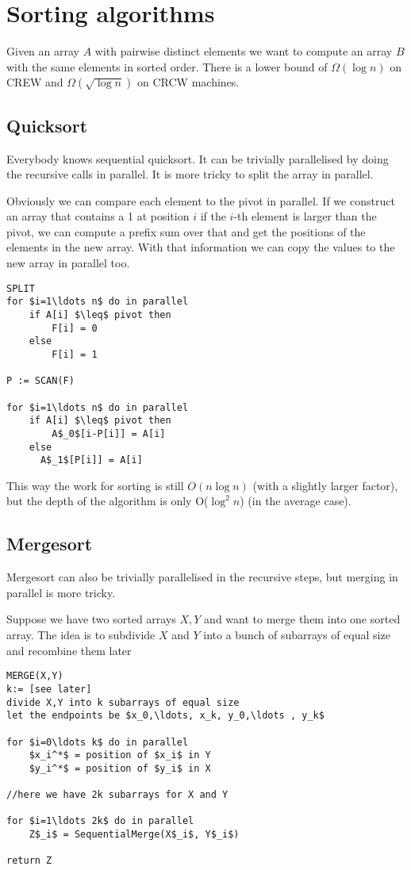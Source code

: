 \section{Sorting algorithms}

Given an array $A$ with pairwise distinct elements we want to compute an array $B$ with the same elements in sorted order. There is a lower bound of $\Omega(\log n)$ on CREW and $\Omega(\sqrt{\log n})$ on CRCW machines.

\subsection{Quicksort}

Everybody knows sequential quicksort. It can be trivially parallelised by doing the recursive calls in parallel. It is more tricky to split the array in parallel.

Obviously we can compare each element to the pivot in parallel. If we construct an array that contains a 1 at position $i$ if the $i$-th element is larger than the pivot, we can compute a prefix sum over that and get the positions of the elements in the new array. With that information we can copy the values to the new array in parallel too.

\begin{lstlisting}
SPLIT
for $i=1\ldots n$ do in parallel
	if A[i] $\leq$ pivot then
		F[i] = 0
	else
		F[i] = 1

P := SCAN(F)

for $i=1\ldots n$ do in parallel
	if A[i] $\leq$ pivot then
		A$_0$[i-P[i]] = A[i]
	else
	  A$_1$[P[i]] = A[i]
\end{lstlisting}

This way the work for sorting is still $O(n\log n)$ (with a slightly larger factor), but the depth of the algorithm is only O($\log^2 n$) (in the average case).

\subsection{Mergesort}

Mergesort can also be trivially parallelised in the recursive steps, but merging in parallel is more tricky.

Suppose we have two sorted arrays $X,Y$ and want to merge them into one sorted array. The idea is to subdivide $X$ and $Y$ into a bunch of subarrays of equal size and recombine them later

\begin{lstlisting}
MERGE(X,Y)
k:= [see later]
divide X,Y into k subarrays of equal size
let the endpoints be $x_0,\ldots, x_k, y_0,\ldots , y_k$

for $i=0\ldots k$ do in parallel
	$x_i^*$ = position of $x_i$ in Y
	$y_i^*$ = position of $y_i$ in X
	
//here we have 2k subarrays for X and Y

for $i=1\ldots 2k$ do in parallel
	Z$_i$ = SequentialMerge(X$_i$, Y$_i$)
	
return Z
\end{lstlisting}

